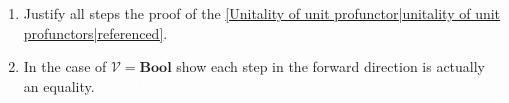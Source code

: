 
\begin{enumerate}
    \item Justify all steps the proof of the \ref{Unitality of unit profunctor|unitality of unit profunctors|referenced}.
    \item In the case of $\mathcal{V}=\mathbf{Bool}$ show each step in the forward direction is actually an equality. \textcolor{white}{NOCARD}
  \end{enumerate}